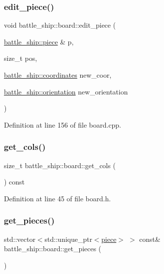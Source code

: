 \subsubsection{\texorpdfstring{edit\+\_\+piece()}{edit\_piece()}}
{\footnotesize\ttfamily void battle\+\_\+ship\+::board\+::edit\+\_\+piece (\begin{DoxyParamCaption}\item[{\hyperlink{classbattle__ship_1_1piece}{battle\+\_\+ship\+::piece} \&}]{p,  }\item[{size\+\_\+t}]{pos,  }\item[{\hyperlink{structbattle__ship_1_1coordinates}{battle\+\_\+ship\+::coordinates}}]{new\+\_\+coor,  }\item[{\hyperlink{namespacebattle__ship_aed87488f0a73f0d0679fe343fb61c784}{battle\+\_\+ship\+::orientation}}]{new\+\_\+orientation }\end{DoxyParamCaption})}



Definition at line 156 of file board.\+cpp.

\mbox{\label{classbattle__ship_1_1board_a387519f8c260d0c9fa25d1a3fc5bf57f}} 
\subsubsection{\texorpdfstring{get\+\_\+cols()}{get\_cols()}}
{\footnotesize\ttfamily size\+\_\+t battle\+\_\+ship\+::board\+::get\+\_\+cols (\begin{DoxyParamCaption}{ }\end{DoxyParamCaption}) const\hspace{0.3cm}{\ttfamily [inline]}}



Definition at line 45 of file board.\+h.

\mbox{\label{classbattle__ship_1_1board_ae621b104b6547d5648eca21c90d43609}} 
\subsubsection{\texorpdfstring{get\+\_\+pieces()}{get\_pieces()}}
{\footnotesize\ttfamily std\+::vector$<$std\+::unique\+\_\+ptr$<$\hyperlink{classbattle__ship_1_1piece}{piece}$>$ $>$ const\& battle\+\_\+ship\+::board\+::get\+\_\+pieces (\begin{DoxyParamCaption}{ }\end{DoxyParamCaption})\hspace{0.3cm}{\ttfamily [inline]}}



